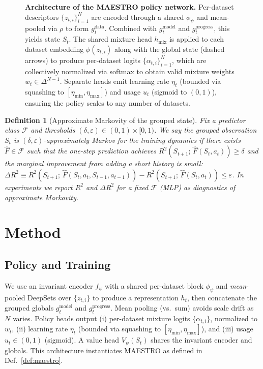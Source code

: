 \documentclass[11pt]{article}
\newtheorem{definition}{Definition}
\newcommand{\1}{\mathbf{1}}
\newcommand{\MAESTRO}{\textsc{MAESTRO}\xspace}
\begin{document}
\begin{figure}[H]
{
}
\caption{\textbf{Architecture of the \MAESTRO{} policy network.} Per-dataset descriptors $\{z_{t,i}\}_{i=1}^N$ are encoded through a shared $\phi_\psi$ and mean-pooled via $\rho$ to form $g^{\text{data}}_t$. Combined with $g^{\text{model}}_t$ and $g^{\text{progress}}_t$, this yields state $S_t$. The shared mixture head $h_{\text{mix}}$ is applied to each dataset embedding $\phi(z_{t,i})$ along with the global state (dashed arrows) to produce per-dataset logits $\{\alpha_{t,i}\}_{i=1}^N$, which are collectively normalized via softmax to obtain valid mixture weights $w_t\in\Delta^{N-1}$. Separate heads emit learning rate $\eta_t$ (bounded via squashing to $[\eta_{\min},\eta_{\max}]$) and usage $u_t$ (sigmoid to $(0,1)$), ensuring the policy scales to any number of datasets.}
\label{fig:policy-network}
\end{figure}

\begin{definition}[Approximate Markovity of the grouped state]\label{def:approx-markov-tight}
Fix a predictor class $\mathcal F$ and thresholds $(\delta,\varepsilon)\in(0,1)\times[0,1)$. We say the grouped observation $S_t$ is \emph{$(\delta,\varepsilon)$-approximately Markov} for the training dynamics if there exists $\hat F\in\mathcal F$ such that the one-step prediction achieves $R^2\!\left(S_{t+1};\,\hat F(S_t,a_t)\right)\ge \delta$ and the marginal improvement from adding a short history is small: $\Delta R^2 \equiv R^2\!\left(S_{t+1};\,\hat F(S_t,a_t,S_{t-1},a_{t-1})\right)-R^2\!\left(S_{t+1};\,\hat F(S_t,a_t)\right)\le \varepsilon$. In experiments we report $R^2$ and $\Delta R^2$ for a fixed $\mathcal F$ (MLP) as diagnostics of approximate Markovity.
\end{definition}


\section{Method}
\subsection{Policy and Training}
We use an invariant encoder $f_\psi$ with a shared per-dataset block $\phi_\psi$ and \emph{mean}-pooled DeepSets over $\{z_{t,i}\}$ to produce a representation $h_t$, then concatenate the grouped globals $g^{\text{model}}_t$ and $g^{\text{progress}}_t$. Mean pooling (vs.\ sum) avoids scale drift as $N$ varies.
Policy heads output (i) per-dataset mixture logits $\{\alpha_{t,i}\}$, normalized to $w_t$, (ii) learning rate $\eta_t$ (bounded via squashing to $[\eta_{\min},\eta_{\max}]$), and (iii) usage $u_t\in(0,1)$ (sigmoid).
A value head $V_\psi(S_t)$ shares the invariant encoder and globals. This architecture instantiates \MAESTRO{} as defined in Def.~\ref{def:maestro}.
\end{document}
